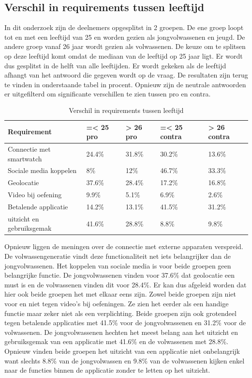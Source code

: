 \subsection{Verschil in requirements tussen leeftijd}
\label{sec:Resultaten vragenlijst}
In dit onderzoek zijn de deelnemers opgesplitst in 2 groepen. De ene groep loopt tot en met een leeftijd van 25 en worden gezien als jongvolwassenen en jeugd. De andere groep vanaf 26 jaar wordt gezien als volwassenen. De keuze om te splitsen op deze leeftijd komt omdat de mediaan van de leeftijd op 25 jaar ligt. Er wordt dus gesplitst in de helft van alle leeftijden. Er wordt gekeken als de leeftijd afhangt van het antwoord die gegeven wordt op de vraag. De resultaten zijn terug te vinden in onderstaande tabel in procent. Opnieuw zijn de neutrale antwoorden er uitgefilterd om significante verschillen te zien tussen pro en contra. 
\begin{table}[h!]
\begin{center}
\begin{tabular}{ |p{2.5cm}|p{2.3cm}|p{2.3cm}||p{2.8cm}|p{2.9cm}| }
 \hline
     \textbf{Requirement} & \textbf{ =< 25 pro} & \textbf{> 26 pro} & \textbf{=< 25 contra} & \textbf{> 26 contra } \\
 \hline
Connectie met smartwatch   &24.4\%    &31.8\% & 30.2\%    &13.6\%   \\
 \hline
Sociale media koppelen  & 8\%    &12\% & 46.7\%    & 33.3\%   \\
 \hline
 Geolocatie  & 37.6\%    &28.4\% & 17.2\%    & 16.8\%   \\
 \hline
  Video bij oefening  & 9.9\%    &5.1\% & 6.9\%    & 2.6\%   \\
 \hline
   Betalende applicatie  & 14.2\%    &13.1\% &41.5\%    &  31.2\%   \\
 \hline
   uitzicht en gebruiksgemak  & 41.6\%    &28.8\% & 8.8\%    &  9.8\%   \\
 \hline
\end{tabular}
\end{center}
  \caption{Verschil in requirements tussen leeftijd}
\label{table:1}
\end{table}

Opnieuw liggen de meningen over de connectie met externe apparaten verspreid. De volwassengeneratie vindt deze functionaliteit net iets belangrijker dan de jongvolwassenen. Het koppelen van sociale media is voor beide groepen geen belangrijke functie. De jongvolwassenen vinden voor 37.6\% dat geolocatie een must is en de volwassenen vinden dit voor 28.4\%. Er kan dus afgeleid worden dat hier ook beide groepen het met elkaar eens zijn. Zowel beide groepen zijn niet voor en niet tegen video’s bij oefeningen. Ze zien het eerder als een handige functie maar zeker niet als een verplichting. Beide groepen zijn ook grotendeel tegen betalende applicaties met 41.5\% voor de jongvolwassenen en 31.2\% voor de volwassenen. De jongvolwassenen hechten het meest belang aan het uitzicht en gebruiksgemak van een applicatie met 41.6\% en de volwassenen met 28.8\%. Opnieuw vinden beide groepen het uitzicht van een applicatie niet onbelangrijk want slechts 8.8\% van de jongvolwassen en 9.8\% van de volwassenen kijken enkel naar de functies binnen de applicatie zonder te letten op het uitzicht. 

